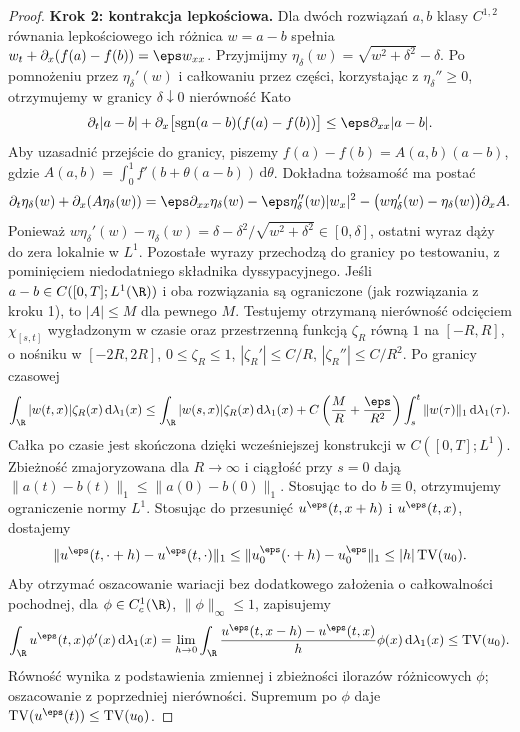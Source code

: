 \begin{proof}
\textbf{Krok 2: kontrakcja lepkościowa.}
Dla dwóch rozwiązań $a,b$ klasy $C^{1,2}$ równania lepkościowego
ich różnica $w=a-b$ spełnia
$w_t+\partial_x(f(a)-f(b))=\eps w_{xx}$.
Przyjmijmy $\eta_\delta(w)=\sqrt{w^2+\delta^2}-\delta$.
Po pomnożeniu przez $\eta_\delta'(w)$ i całkowaniu przez
części, korzystając z $\eta_\delta''\ge0$, otrzymujemy
w granicy $\delta\downarrow0$ nierówność Kato
\[
 \partial_t|a-b|+\partial_x\bigl[
 \operatorname{sgn}(a-b)(f(a)-f(b))\bigr]
 \le\eps\partial_{xx}|a-b|.
\]
Aby uzasadnić przejście do granicy, piszemy
$f(a)-f(b)=A(a,b)(a-b)$, gdzie
$A(a,b)=\int_0^1f'(b+\theta(a-b))\,\mathrm d\theta$.
Dokładna tożsamość ma postać
\[
 \partial_t\eta_\delta(w)+\partial_x(A\eta_\delta(w))
 =\eps\partial_{xx}\eta_\delta(w)
 -\eps\eta_\delta''(w)|w_x|^2
 -\bigl(w\eta_\delta'(w)-\eta_\delta(w)\bigr)\partial_x A.
\]
Ponieważ $w\eta_\delta'(w)-\eta_\delta(w)
=\delta-\delta^2/\sqrt{w^2+\delta^2}\in[0,\delta]$,
ostatni wyraz dąży do zera lokalnie w $L^1$.
Pozostałe wyrazy przechodzą do granicy po testowaniu,
z pominięciem niedodatniego składnika dyssypacyjnego.
Jeśli $a-b\in C([0,T];L^1(\R))$ i oba rozwiązania
są ograniczone (jak rozwiązania z kroku 1), to
$|A|\le M$ dla pewnego $M$. Testujemy otrzymaną
nierówność odcięciem $\chi_{[s,t]}$ wygładzonym
w czasie oraz przestrzenną funkcją $\zeta_R$ równą
$1$ na $[-R,R]$, o nośniku w $[-2R,2R]$,
$0\le\zeta_R\le1$,
$|\zeta_R'|\le C/R$, $|\zeta_R''|\le C/R^2$.
Po granicy czasowej
\[
 \int_\R |w(t,x)|\zeta_R(x)\,\mathrm d\lambda_1(x)
 \le \int_\R |w(s,x)|\zeta_R(x)\,\mathrm d\lambda_1(x)
 +C\left(\frac M R+\frac{\eps}{R^2}\right)
   \int_s^t\|w(\tau)\|_1\,\mathrm d\lambda_1(\tau).
\]
Całka po czasie jest skończona dzięki wcześniejszej
konstrukcji w $C([0,T];L^1)$. Zbieżność
zmajoryzowana dla $R\to\infty$ i ciągłość przy $s=0$
dają $\|a(t)-b(t)\|_1\le\|a(0)-b(0)\|_1$.
Stosując to do $b\equiv0$, otrzymujemy ograniczenie
normy $L^1$. Stosując do przesunięć $u^\eps(t,x+h)$
i $u^\eps(t,x)$, dostajemy
\[
 \|u^\eps(t,\cdot+h)-u^\eps(t,\cdot)\|_1
 \le\|u_0^\eps(\cdot+h)-u_0^\eps\|_1
 \le |h|\operatorname{TV}(u_0).
\]
Aby otrzymać oszacowanie wariacji bez dodatkowego
założenia o całkowalności pochodnej, dla
$\phi\in C_c^1(\R)$, $\|\phi\|_\infty\le1$,
zapisujemy
\[
 \int_\R u^\eps(t,x)\phi'(x)\,\mathrm d\lambda_1(x)
 =\lim_{h\to0}\int_\R
 \frac{u^\eps(t,x-h)-u^\eps(t,x)}{h}\phi(x)
 \,\mathrm d\lambda_1(x)
 \le\operatorname{TV}(u_0).
\]
Równość wynika z podstawienia zmiennej i zbieżności
ilorazów różnicowych $\phi$; oszacowanie z poprzedniej
nierówności. Supremum po $\phi$ daje
$\operatorname{TV}(u^\eps(t))\le\operatorname{TV}(u_0)$.


\end{proof}

